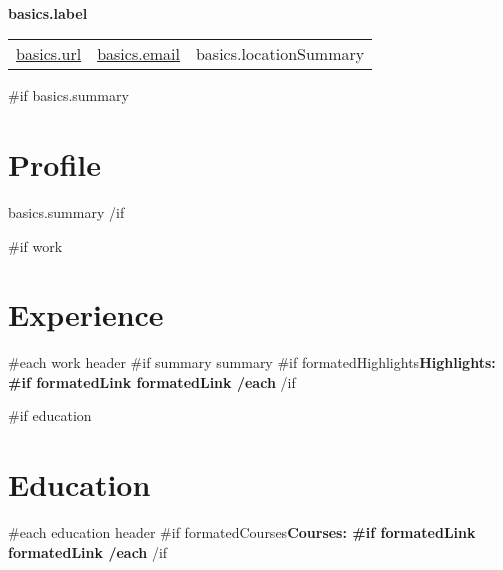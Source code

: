 \documentclass[letterpaper]{article}
\begin{document}
\begin{paracol}{2}
\begin{leftcolumn*}
\end{leftcolumn*}

\begin{rightcolumn}
  \begin{center}
    \textbf {
      \Huge
    }\\\smallskip
    \textbf {
      \color{primary-950}\large {{ basics.label }}
    }\\\smallskip

    \begin{supertabular}{l l l}
      \href { {{ basics.url }} }{ {{ basics.url }} } &
      \href { mailto:{{ basics.email }} }{ {{ basics.email }} } &
       {{ basics.locationSummary }} \\
    \end{supertabular}

  \end{center}

  {{#if basics.summary}}
  \section*{Profile} {
    { {{ basics.summary }} }
  }
  {{/if}}

  {{#if work}}
  \section*{Experience} {
    {{#each work}}
      {{ header }}
      {{#if summary}}{{ summary }}
      {{#if formatedHighlights}}\bfseries Highlights: 
      {{#if formatedLink}}{{ formatedLink }}
    {{/each}}
  }
  {{/if}}
  
  {{#if education}}
  \section*{Education} {
    {{#each education}}
      {{ header }}
      {{#if formatedCourses}}\bfseries Courses: 
      {{#if formatedLink}}{{ formatedLink }}
    {{/each}}
  }
  {{/if}}


\end{rightcolumn}
\end{paracol}
\end{document}
